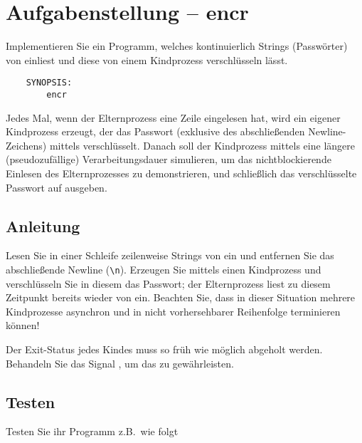 




\section*{Aufgabenstellung -- encr}

Implementieren Sie ein Programm, welches kontinuierlich Strings
(Passwörter) von  einliest und diese von einem Kindprozess
verschlüsseln lässt.

\begin{verbatim}
    SYNOPSIS:
        encr
\end{verbatim}

Jedes Mal, wenn der Elternprozess eine Zeile eingelesen hat, wird ein
eigener Kindprozess erzeugt, der das Passwort (exklusive des
abschließenden Newline-Zeichens) mittels 
verschlüsselt. Danach soll der Kindprozess mittels 
eine längere (pseudozufällige) Verarbeitungsdauer simulieren, um das
nichtblockierende Einlesen des Elternprozesses zu demonstrieren, und
schließlich das verschlüsselte Passwort auf  ausgeben.

\subsection*{Anleitung}

Lesen Sie in einer Schleife zeilenweise Strings von  ein
und entfernen Sie das abschließende Newline (\verb+\n+). Erzeugen Sie
mittels  einen Kindprozess und verschlüsseln Sie in
diesem das Passwort; der Elternprozess liest zu diesem Zeitpunkt
bereits wieder von  ein. Beachten Sie, dass in dieser
Situation mehrere Kindprozesse asynchron und in nicht vorhersehbarer
Reihenfolge terminieren können!

Der Exit-Status jedes Kindes muss so früh wie möglich abgeholt werden.
Behandeln Sie das Signal , um das zu gewährleisten.

\subsection*{Testen}

Testen Sie ihr Programm z.B.\ wie folgt


